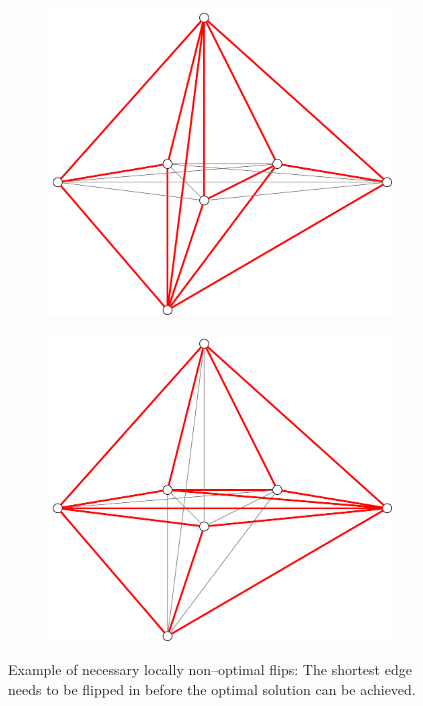 \begin{figure}[ht]
  \centering
  \begin{subfigure}{0.4\textwidth}
    \centering
    \includegraphics[width=\textwidth]{img/nonoptimal_flips_1.pdf}
  \end{subfigure}
  \hspace{1em}
  \VRule
  \hspace{1em}
  \centering
  \begin{subfigure}{0.4\textwidth}
    \centering
    \includegraphics[width=\textwidth]{img/nonoptimal_flips_2.pdf}
  \end{subfigure}
  \caption{\label{fig:nonoptimal_flips}Example of necessary locally
    non--optimal flips: The shortest edge needs to be flipped in
    before the optimal solution can be achieved.}
\end{figure}

